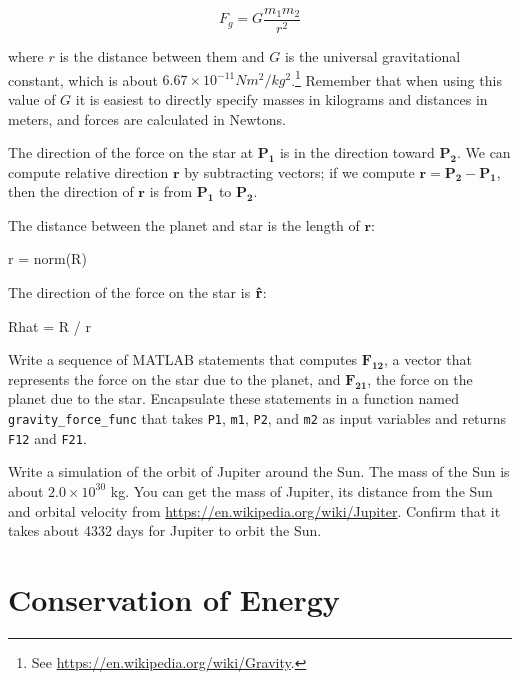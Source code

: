 \documentclass[
]{book}
\numberwithin{Answer}{chapter}
\numberwithin{Exercise}{chapter}
\renewcommand{\vec}[1]{\bm{\mathbf{#1}}}
\newcommand{\uveci}{{\bm{\hat{\textnormal{\bfseries\i}}}}}
\newcommand{\uvecj}{{\bm{\hat{\textnormal{\bfseries\j}}}}}
\newcommand{\uvec}[1]{%
    \ifthenelse{\equal{#1}{i}}%
        {\uveci}{%
    \ifthenelse{\equal{#1}{j}}%
        {\uvecj}{%
    {\bm{\hat{\mathbf{#1}}}}%
}}}
\begin{document}
\begin{equation}
F_g = G \frac{m_1 m_2}{r^2}
\end{equation}

where $r$ is the distance between them and $G$ is the universal
gravitational constant, which is about $6.67 \times 10^{-11} N m^2 /
kg^2$.\footnote{See \url{https://en.wikipedia.org/wiki/Gravity}.}
Remember that when using this
value of $G$ it is easiest to directly specify
masses
in kilograms and distances in meters, and forces are calculated in Newtons.

The direction of the force on the star at $\vec{P_1}$ is in the
direction toward $\vec{P_2}$.  We can compute relative direction $\vec{r}$ by
subtracting vectors; if we compute $\vec{r} = \vec{P_2} - \vec{P_1}$, then
the direction of $\vec{r}$ is from $\vec{P_1}$ to $\vec{P_2}$.

The distance between the planet and star is the length of $\vec{r}$:

\begin{code}
r = norm(R)
\end{code}

The direction of the force on the star is $\uvec{r}$:

\begin{code}
Rhat = R / r
\end{code}

\begin{ex}
Write a sequence of MATLAB statements that computes $\vec{F_{12}}$, a vector
that represents the force on the star due to the planet, and
$\vec{F_{21}}$, the force on the planet due to the star. Encapsulate
these statements in a function named {\tt gravity\_force\_func} that
takes {\tt P1}, {\tt m1}, {\tt P2}, and {\tt m2} as input variables
and returns {\tt F12} and {\tt F21}.
\end{ex}

\begin{ex}
\label{ex:jupiter}
Write a simulation of the orbit of Jupiter around the Sun.  The mass
of the Sun is about $2.0 \times 10^{30}$ kg.  You can get the mass of
Jupiter, its distance from the Sun and orbital velocity from
\url{https://en.wikipedia.org/wiki/Jupiter}.  Confirm that it takes
about 4332 days for Jupiter to orbit the Sun.
\end{ex}


\section{Conservation of Energy}
\end{document}
